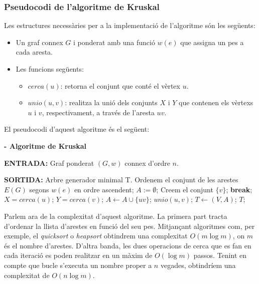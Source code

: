 \documentclass{article}
\renewcommand{\algorithmicrequire}{\textbf{ENTRADA: }}
\renewcommand{\algorithmicensure}{\textbf{SORTIDA: }}
\begin{document}
\subsubsection{Pseudocodi de l'algoritme de Kruskal}
Les estructures necessàries per a la implementació de l'algoritme són les següents:
\begin{itemize}
    \item Un graf connex $G$ i ponderat amb una funció $w(e)$ que assigna un pes a cada aresta.
    \item Les funcions següents:
          \begin{itemize}
              \item $cerca (u)$: retorna el conjunt que conté el vèrtex $u$.
              \item $unio (u,v)$: realitza la unió dels conjunts $X$ i $Y$ que contenen els vèrtexs $u$ i $v$, respectivament, a través de l'aresta $uv$.
          \end{itemize}
\end{itemize}
El pseudocodi d'aquest algoritme és el següent:
\begin{algorithm}[H]
    \caption{\textbf{- Algoritme de Kruskal}}
    \begin{algorithmic}
        \item \algorithmicrequire{Graf ponderat $(G,w)$ connex d’ordre $n$.}
        \item \algorithmicensure{Arbre generador minimal T.}
        \State
        \State Ordenem el conjunt de les arestes $E(G)$ segons $w(e)$ en ordre ascendent;
        \State $A:=\emptyset$;
        \State Creem el conjunt $\{v\}$;
        \EndFor
        \State\textbf{break};
        \EndIf
        \State $X=cerca(u)$;
        \State $Y=cerca(v)$;
        \State $A\gets A\cup \{uv\}$;
        \State $unio(u,v)$;
        \EndIf
        \EndFor
        \State $T\gets (V,A)$;
        \State \Return $T$;
    \end{algorithmic}
\end{algorithm}
\par \cite{7} \cite{8}
\par
Parlem ara de la complexitat d'aquest algoritme. La primera part tracta d’ordenar la llista d’arestes en funció del seu pes. Mitjançant algoritmes com, per exemple, el \textit{quicksort} o \textit{heapsort} obtindrem una complexitat $O(m\log m)$, on $m$ és el nombre d’arestes. D'altra banda, les dues operacions de cerca que es fan en cada iteració es poden realitzar en un màxim de $O(\log m)$ passos. Tenint en compte que bucle s'executa un nombre proper a $n$ vegades, obtindríem una complexitat de $O(n\log m)$.
\end{document}
